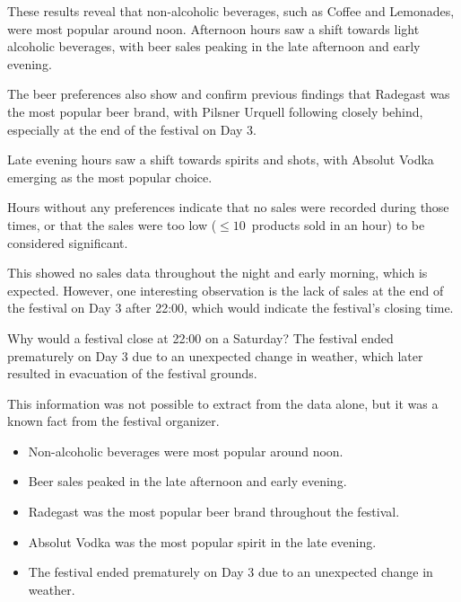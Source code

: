 These results reveal that non-alcoholic beverages, such as Coffee and Lemonades, were most popular around noon.
Afternoon hours saw a shift towards light alcoholic beverages, with beer sales peaking in the late afternoon and early evening.

The beer preferences also show and confirm previous findings that Radegast was the most popular beer brand, with Pilsner Urquell following closely behind, especially at the end of the festival on Day 3.

Late evening hours saw a shift towards spirits and shots, with Absolut Vodka emerging as the most popular choice.

Hours without any preferences indicate that no sales were recorded during those times, or that the sales were too low (\(\leq 10\)~products sold in an hour) to be considered significant.

This showed no sales data throughout the night and early morning, which is expected.
However, one interesting observation is the lack of sales at the end of the festival on Day 3 after 22:00, which would indicate the festival's closing time.

\begin{infobox}{Why would a festival close at 22:00 on a Saturday?}
	The festival ended prematurely on Day 3 due to an unexpected change in weather, which later resulted in evacuation of the festival grounds.
\end{infobox}

This information was not possible to extract from the data alone, but it was a known fact from the festival organizer.

\begin{keytakeaways}
	\begin{itemize}
		\item Non-alcoholic beverages were most popular around noon.
		\item Beer sales peaked in the late afternoon and early evening.
		\item Radegast was the most popular beer brand throughout the festival.
		\item Absolut Vodka was the most popular spirit in the late evening.
		\item The festival ended prematurely on Day 3 due to an unexpected change in weather.
	\end{itemize}
\end{keytakeaways}


